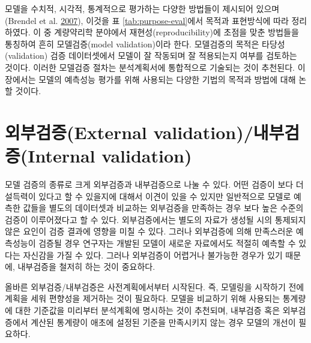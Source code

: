 \documentclass[
  11pt,
  krantz2, a4paper, twoside]{krantz}
\theoremstyle{definition}
\theoremstyle{definition}
\theoremstyle{definition}
\theoremstyle{remark}
\begin{document}
모델을 수치적, 시각적, 통계적으로 평가하는 다양한 방법들이 제시되어 있으며 (Brendel et al. \protect\hyperlink{ref-pmid17328581}{2007}), 이것을 표 \ref{tab:purpose-eval}에서 목적과 표현방식에 따라 정리하였다. 이 중 계량약리학 분야에서 재현성(reproducibility)에 초점을 맞춘 방법들을 통칭하여 흔히 모델검증(model validation)이라 한다. 모델검증의 목적은 타당성(validation) 검증 데이터셋에서 모델이 잘 작동되며 잘 적용되는지 여부를 검토하는 것이다. 이러한 모델검증 절차는 분석계획서에 통합적으로 기술되는 것이 추천된다. 이 장에서는 모델의 예측성능 평가를 위해 사용되는 다양한 기법의 목적과 방법에 대해 논할 것이다.

\hypertarget{uxc678uxbd80uxac80uxc99dexternal-validationuxb0b4uxbd80uxac80uxc99dinternal-validation}{%
\section{외부검증(External validation)/내부검증(Internal validation)}\label{uxc678uxbd80uxac80uxc99dexternal-validationuxb0b4uxbd80uxac80uxc99dinternal-validation}}


모델 검증의 종류로 크게 외부검증과 내부검증으로 나눌 수 있다. 어떤 검증이 보다 더 설득력이 있다고 할 수 있을지에 대해서 이견이 있을 수 있지만 일반적으로 모델로 예측한 값들을 별도의 데이터셋과 비교하는 외부검증을 만족하는 경우 보다 높은 수준의 검증이 이루어졌다고 할 수 있다. 외부검증에서는 별도의 자료가 생성될 시의 통제되지 않은 요인이 검증 결과에 영향을 미칠 수 있다. 그러나 외부검증에 의해 만족스러운 예측성능이 검증될 경우 연구자는 개발된 모델이 새로운 자료에서도 적절히 예측할 수 있다는 자신감을 가질 수 있다. 그러나 외부검증이 어렵거나 불가능한 경우가 있기 때문에, 내부검증을 철저히 하는 것이 중요하다.

올바른 외부검증/내부검증은 사전계획에서부터 시작된다. 즉, 모델링을 시작하기 전에 계획을 세워 편향성을 제거하는 것이 필요하다. 모델을 비교하기 위해 사용되는 통계량에 대한 기준값을 미리부터 분석계획에 명시하는 것이 추천되며, 내부검증 혹은 외부검증에서 계산된 통계량이 애초에 설정된 기준을 만족시키지 않는 경우 모델의 개선이 필요하다.
\end{document}
